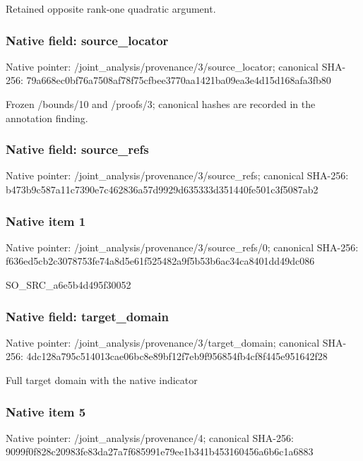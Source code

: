 \documentclass[10pt,a4paper]{article}
\begin{document}
\begingroup\raggedright\sloppy Retained opposite rank-one quadratic argument.\par\endgroup

\subsubsection{Native field: source\_\allowbreak{}locator}
Native pointer: /joint\_\allowbreak{}analysis/provenance/3/source\_\allowbreak{}locator; canonical SHA-256: 79a668ec0bf76a7508af78f75cfbee3770aa1421ba09ea3e4d15d168afa3fb80

\begingroup\raggedright\sloppy Frozen /\allowbreak{}bounds/\allowbreak{}10 and /\allowbreak{}proofs/\allowbreak{}3;\allowbreak{} canonical hashes are recorded in the annotation finding.\par\endgroup

\subsubsection{Native field: source\_\allowbreak{}refs}
Native pointer: /joint\_\allowbreak{}analysis/provenance/3/source\_\allowbreak{}refs; canonical SHA-256: b473b9c587a11c7390e7c462836a57d9929d635333d351440fe501c3f5087ab2

\subsubsection{Native item 1}
Native pointer: /joint\_\allowbreak{}analysis/provenance/3/source\_\allowbreak{}refs/0; canonical SHA-256: f636ed5cb2c3078753fe74a8d5e61f525482a9f5b53b6ac34ca8401dd49dc086

\begingroup\raggedright\sloppy SO\_\allowbreak{}SRC\_\allowbreak{}a6e5b4d495f30052\par\endgroup

\subsubsection{Native field: target\_\allowbreak{}domain}
Native pointer: /joint\_\allowbreak{}analysis/provenance/3/target\_\allowbreak{}domain; canonical SHA-256: 4dc128a795c514013cae06bc8e89bf12f7eb9f956854fb4cf8f445e951642f28

\begingroup\raggedright\sloppy Full target domain with the native indicator\par\endgroup

\subsubsection{Native item 5}
Native pointer: /joint\_\allowbreak{}analysis/provenance/4; canonical SHA-256: 9099f0f828c20983fe83da27a7f685991e79ee1b341b453160456a6b6c1a6883
\end{document}
